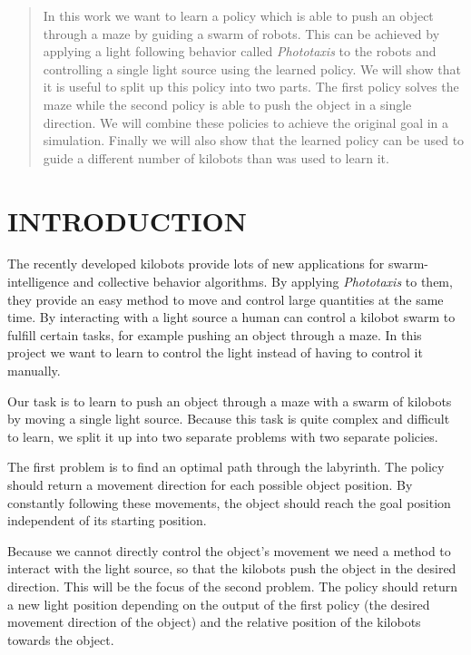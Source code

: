 \documentclass[twoside]{article}
\begin{document}

\begin{abstract}

In this work we want to learn a policy which is able to push an object through a
maze by guiding a swarm of robots. This can be achieved by applying a light
following behavior called \emph{Phototaxis} to the robots and controlling a
single light source using the learned policy. We will show that it is useful
to split up this policy into two parts. The first policy solves the maze while
the second policy is able to push the object in a single direction. We will
combine these policies to achieve the original goal in a simulation.
Finally we will also show that the learned policy can be used to guide a
different number of kilobots than was used to learn it.

\end{abstract}

\section{INTRODUCTION}

The recently developed kilobots provide lots of new applications for
swarm-intelligence and collective behavior algorithms. By applying \emph{Phototaxis}
to them, they provide an easy method to move and control large quantities at the
same time. By interacting with a light source a human can control a kilobot swarm
to fulfill certain tasks, for example pushing an object through a
maze\cite{kilobotMaze}. In this project we want to learn to control the light
instead of having to control it manually.

Our task is to learn to push an object through a maze with a swarm of kilobots
by moving a single light source. Because this task is quite complex and
difficult to learn, we split it up into two separate problems with two separate
policies.

The first problem is to find an optimal path through the labyrinth. The policy
should return a movement direction for each possible object position. By
constantly following these movements, the object should reach the goal position
independent of its starting position.

Because we cannot directly control the object's movement we need a method to
interact with the light source, so that the kilobots push the object in the
desired direction. This will be the focus of the second problem. The policy
should return a new light position depending on the output of the first policy
(the desired movement direction of the object) and the relative position of the
kilobots towards the object.
\end{document}
